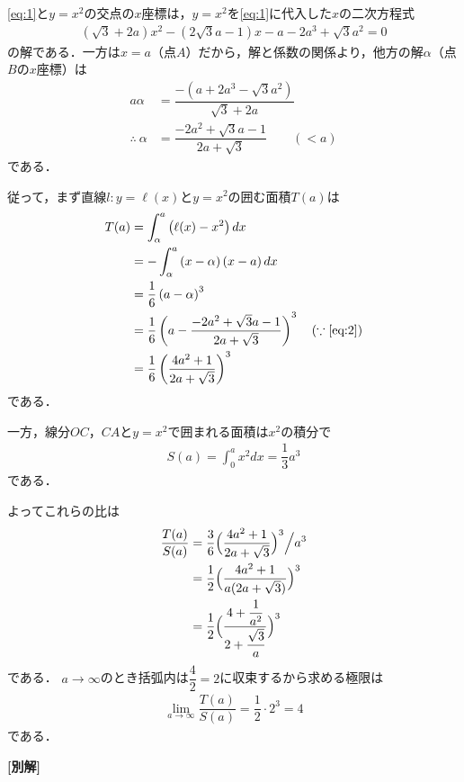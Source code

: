 \documentclass[../../main.tex]{subfiles}
\begin{document}
\cref{eq:1}と$y=x^2$の交点の$x$座標は，$y=x^2$を\cref{eq:1}に代入した$x$の二次方程式
\begin{align}
  (\sqrt{3}+2a)x^2 - (2\sqrt{3}a-1)x - a - 2a^3 + \sqrt{3}a^2 = 0
\end{align}
の解である．一方は$x=a$（点$A$）だから，解と係数の関係より，他方の解$\alpha$（点$B$の$x$座標）は
\begin{align}
  a\alpha&=\dfrac{-(a+2a^3-\sqrt{3}a^2)}{\sqrt{3}+2a}\\
  \therefore\
  \alpha&=\dfrac{-2a^2+\sqrt{3}a-1}{2a+\sqrt{3}}\qquad(<a) \label{eq:2}
\end{align}
である．

従って，まず直線$l: y=\ell(x)$と$y=x^2$の囲む面積$T(a)$は
\begin{align}
  T(a)
  &= \int_{\alpha}^{a} \left(\ell(x) - x^2\right) dx \\
  &= -\int_{\alpha}^{a} \left(x - \alpha \right)\left(x - a\right) dx \\
  &= \dfrac{1}{6}\left(a-\alpha\right)^3 \\
  &= \dfrac{1}{6}\left(a- \dfrac{-2a^2+\sqrt{3}a-1}{2a+\sqrt{3}} \right)^3 \quad (\because\text{\cref{eq:2}})\\
  &= \dfrac{1}{6}\left(\dfrac{4a^2+1}{2a+\sqrt{3}}\right)^3 \label{eq:3}
\end{align}
である．

一方，線分$OC$，$CA$と$y=x^2$で囲まれる面積は$x^2$の積分で
\begin{align}
  S(a)=\int_0^ax^2dx=\dfrac{1}{3}a^3 \label{eq:4}
\end{align}
である．

よってこれらの比は
\begin{align}
  \dfrac{T(a)}{S(a)}
  &=\dfrac{3}{6}\Bigl(\dfrac{4a^2+1}{2a+\sqrt{3}}\Bigr)^3\Big/a^3 \\
  &=\dfrac{1}{2}\Bigl(\dfrac{4a^2+1}{a(2a+\sqrt{3})}\Bigr)^3 \\
  &=\dfrac{1}{2}\Bigl(\dfrac{4+\dfrac{1}{a^2}}{2+\dfrac{\sqrt{3}}{a}}\Bigr)^3
\end{align}
である．
$a\to\infty$のとき括弧内は$\dfrac{4}{2}=2$に収束するから求める極限は
\begin{align}
  \lim_{a\to\infty}\dfrac{T(a)}{S(a)}=\dfrac{1}{2}\cdot2^3=4
\end{align}
である．

{\bf [別解]}
\end{document}
